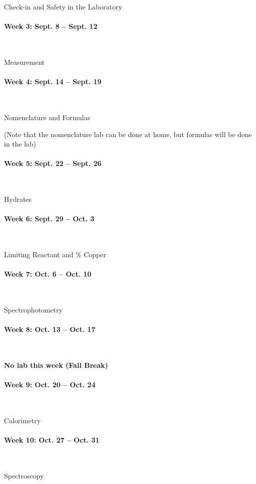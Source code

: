 \documentclass[12pt, letterpaper]{article}
\begin{document}
Check-in and Safety in the Laboratory

\paragraph{Week 3: Sept. 8 -- Sept. 12}~

Measurement

\paragraph{Week 4: Sept. 14 -- Sept. 19}~

Nomenclature and Formulas

(Note that the nomenclature lab can be done at home, but formulas will be done in the lab)

\paragraph{Week 5: Sept. 22 -- Sept. 26}~

Hydrates

\paragraph{Week 6: Sept. 29 -- Oct. 3}~

Limiting Reactant and \% Copper

\paragraph{Week 7: Oct. 6 -- Oct. 10}~

Spectrophotometry

\paragraph{Week 8: Oct. 13 -- Oct. 17}~

\textbf{No lab this week (Fall Break)}

\paragraph{Week 9: Oct. 20 -- Oct. 24}~

Calorimetry

\paragraph{Week 10: Oct. 27 -- Oct. 31}~

Spectroscopy
\end{document}
